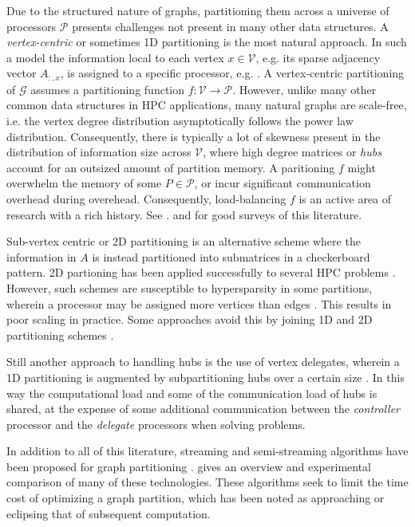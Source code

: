 \documentclass{report}
\begin{document}
Due to the structured nature of graphs, partitioning them across a universe of processors $\mathcal{P}$ presents challenges not present in many other data structures.
A \emph{vertex-centric} or sometimes 1D partitioning is the most natural approach.
In such a model the information local to each vertex $x \in \mathcal{V}$, e.g. its sparse adjacency vector $A_{:,x}$, is assigned to a specific processor, e.g. \cite{malewicz2010pregel}.
A vertex-centric partitioning of $\mathcal{G}$ assumes a partitioning function $f: \mathcal{V} \rightarrow \mathcal{P}$.
However, unlike many other common data structures in HPC applications, many natural graphs are scale-free, i.e. the vertex degree distribution asymptotically follows the power law distribution.
Consequently, there is typically a lot of skewness present in the distribution of information size across $\mathcal{V}$, where high degree matrices or \emph{hubs} account for an outsized amount of partition memory.
A paritioning $f$ might overwhelm the memory of some $P \in \mathcal{P}$, or incur significant communication overhead during overehead.
Consequently, load-balancing $f$ is an active area of research with a rich history.
See \cite{mccune2015thinking}. and \cite{bulucc2016recent} for good surveys of this literature. 

Sub-vertex centric or 2D partitioning is an alternative scheme where the information in $A$ is instead partitioned into submatrices in a checkerboard pattern.
2D partioning has been applied successfully to several HPC problems \cite{bulucc2011parallel, yoo2011scalable, simmhan2014goffish}.
However, such schemes are susceptible to hypersparsity in some partitions, wherein a processor may be assigned more vertices than edges \cite{buluc2008representation}.
This results in poor scaling in practice.
Some approaches avoid this by joining 1D and 2D partitioning schemes \cite{boman2013scalable}.

Still another approach to handling hubs is the use of vertex delegates, wherein a 1D partitioning is augmented by subpartitioning hubs over a certain size \cite{pearce2014faster}.
In this way the computational load and some of the communication load of hubs is shared, at the expense of some additional communication between the \emph{controller} processor and the \emph{delegate} processors when solving problems.

In addition to all of this literature, streaming and semi-streaming algorithms have been proposed for graph partitioning \cite{stanton2012streaming, tsourakakis2014fennel, xu2015heterogeneous}.
\cite{guo2017modeling} gives an overview and experimental comparison of many of these technologies.
These algorithms seek to limit the time cost of optimizing a graph partition, which has been noted as approaching or eclipsing that of subsequent computation.
 
\end{document}
